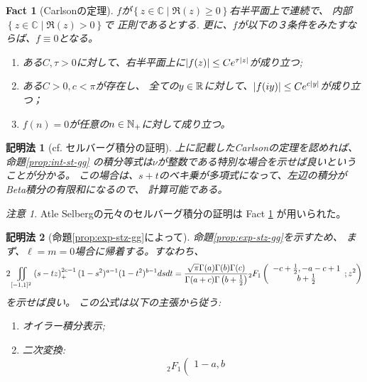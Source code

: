 \documentclass[12pt,a4paper,dvipdfmx]{jsarticle}
\numberwithin{equation}{section}
\theoremstyle{jplain}
\newtheorem{method}{記明法}
\newtheorem{fact}[thm]{Fact}
\theoremstyle{remark}
\newtheorem*{remark*}{注意}
\theoremstyle{definition}
\begin{document}
{\begin{fact}[Carlsonの定理]
	\label{fact:carlson}
	$f$が$\left\{ z\in\mathbb{C}\mid \Re(z)\ge0 \right\}$右半平面上で連続で、
	内部$\left\{ z\in\mathbb{C}\mid\Re(z)>0 \right\}$で
	正則であるとする.
	更に、$f$が以下の３条件をみたすならば、$f\equiv0$となる。
	\begin{enumerate}
		\item ある$C,\tau>0$に対して、右半平面上に$\left|f(z)\right|\le C e^{\tau\left|z\right|}$が成り立つ;
		\item ある$ C>0,c<\pi$が存在し、
			全ての$y\in\mathbb{R}$に対して、$\left|f(iy)\right|\le Ce^{c\left|y\right|}$が成り立つ；
		\item $f(n)=0$が任意の$n\in\mathbb{N}_+$に対して成り立つ。
	\end{enumerate}
\end{fact}
\begin{method}[cf. セルバーグ積分の証明]
	上に記載したCarlsonの定理を認めれば、
	命題\ref{prop:int-st-gg}
	の積分等式は$\nu$が整数である特別な場合を示せば良いということが分かる。
この場合は、$s+t$のベキ乗が多項式になって、左辺の積分がBeta積分の有限和になるので、
計算可能である。
\end{method}
\begin{remark*}
	Atle Selbergの元々のセルバーグ積分の証明\cite{Selberg:411367}は Fact \ref{fact:carlson} が用いられ{た}。
\end{remark*}
\begin{method}[命題\ref{prop:exp-stz-gg}によって]
	命題\ref{prop:exp-stz-gg}を示すため、
	まず、$\ell=m=0$場合に帰着する。すなわち、
	\begin{multline}
				2\iint\displaylimits_{[-1,1]^2} \left( s-tz \right)_+^{2c-1}  (1 - s^2)^{a - 1} (1 -
				t^2)^{b - 1} d s d t
				=
				\frac{\sqrt{\pi} \Gamma (a) \Gamma (b) \Gamma
			(c)}{\Gamma (a + c) \Gamma \left( b + \frac{1}{2} \right)} {}_2 F_1 \left(
			\begin{array}{c}
				  - c + \frac{1}{2}, - a - c + 1\\
				    b + \frac{1}{2}
			    \end{array} ; z^2 \right)
				\label{eqn:prop21}
	\end{multline}
を示せば良い。
	この公式は以下の主張から従う:
	\begin{enumerate}
		\item オイラー積分表示;
		\item 二次変換:
			\begin{equation*}
			\quad {}_2 F_1 \left( \begin{array}{c}
				  1 - a, b\\

\end{array}
\end{equation*}
\end{enumerate}
\end{method}}
\end{document}

